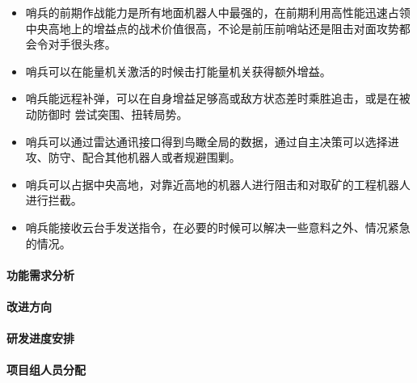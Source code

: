     
            \begin{itemize}
                \item 哨兵的前期作战能力是所有地面机器人中最强的，在前期利用高性能迅速占领中央高地上的增益点的战术价值很高，不论是前压前哨站还是阻击对面攻势都会令对手很头疼。
                \item 哨兵可以在能量机关激活的时候击打能量机关获得额外增益。
                \item 哨兵能远程补弹，可以在自身增益足够高或敌方状态差时乘胜追击，或是在被动防御时 尝试突围、扭转局势。
                \item 哨兵可以通过雷达通讯接口得到鸟瞰全局的数据，通过自主决策可以选择进攻、防守、配合其他机器人或者规避围剿。
                \item 哨兵可以占据中央高地，对靠近高地的机器人进行阻击和对取矿的工程机器人进行拦截。
                \item 哨兵能接收云台手发送指令，在必要的时候可以解决一些意料之外、情况紧急的情况。
            \end{itemize}
    
    \paragraph{功能需求分析}

    
    \paragraph{改进方向}


    \paragraph{研发进度安排}


    \paragraph{项目组人员分配}

    